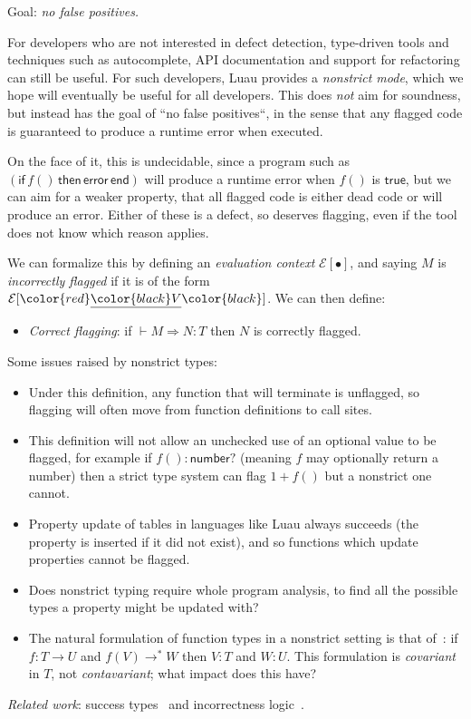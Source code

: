 \documentclass[acmsmall]{acmart}
\newcommand{\squnder}[1]{\color{red}\underline{{\color{black}#1}}\color{black}}
\newcommand{\evCtx}{\mathcal{E}}
\newcommand{\TRUE}{\mathsf{true}}
\newcommand{\NUMBER}{\mathsf{number}}
\newcommand{\ERROR}{\mathsf{error}}
\newcommand{\IF}{\mathsf{if}\,}
\newcommand{\THEN}{\,\mathsf{then}\,}
\newcommand{\END}{\,\mathsf{end}}
\begin{document}
Goal: \emph{no false positives.}

For developers who are not interested in defect detection, type-driven
tools and techniques such as autocomplete, API documentation
and support for refactoring can still be useful.
For such developers, Luau provides a
\emph{nonstrict mode}, which we hope will eventually be useful for all
developers. This does \emph{not} aim for soundness, but instead has
the goal of ``no false positives``, in the sense that any flagged code
is guaranteed to produce a runtime error when executed.

On the face of it, this is undecidable, since a program such as
$(\IF f() \THEN \ERROR \END)$ will produce a runtime error when $f()$ is
$\TRUE$, but we can aim for a weaker property, that all flagged code
is either dead code or will produce an error. Either of these is a
defect, so deserves flagging, even if the tool does not know
which reason applies.

We can formalize this by defining an \emph{evaluation context}
$\evCtx[\bullet]$, and saying $M$ is \emph{incorrectly flagged}
if it is of the form $\evCtx[\squnder{V}]$. We can then define:
\begin{itemize}
\item \emph{Correct flagging}: if ${} \vdash M \Rightarrow N : T$
  then $N$ is correctly flagged.
\end{itemize}
Some issues raised by nonstrict types:
\begin{itemize}

\item Under this definition, any function that will terminate is unflagged, so
  flagging will often move from function definitions to call sites.

\item This definition will not allow an unchecked use of an optional value
  to be flagged, for example if $f() : \NUMBER?$ (meaning $f$ may optionally return a number)
  then a strict type system can flag $1 + f()$ but a nonstrict one cannot.

\item Property update of tables in languages like Luau always succeeds
  (the property is inserted if it did not exist), and so functions which
  update properties cannot be flagged.

\item Does nonstrict typing require whole program analysis,
  to find all the possible types a property might be updated with?

\item The natural formulation of function types in a nonstrict setting
  is that of~\cite{???}: if $f: T \rightarrow U$ and $f(V) \rightarrow^* W$
  then $V:T$ and $W:U$. This formulation is \emph{covariant} in $T$,
  not \emph{contavariant}; what impact does this have?
  
\end{itemize}
\emph{Related work}: success types~\cite{SuccessTyping} and incorrectness logic~\cite{IncorrectnessLogic}.
\end{document}
